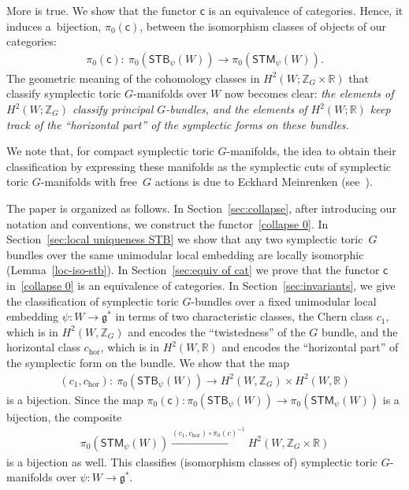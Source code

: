\documentclass[10pt,a4paper]{amsart}
\numberwithin{equation}{section}
\begin{document}
More is true.  We show that the functor ${\textsf{c}}$ is an
equivalence of categories. Hence, it induces a~bijection,
$\pi_0({\textsf{c}})$, between the isomorphism classes of objects of our
categories:
\begin{gather*}
\pi_0({\textsf{c}}) \colon \  \pi_0({\textsf{STB}}_\psi (W))   \to
                  \pi_0({\textsf{STM}}_\psi(W)).
\end{gather*}
The geometric meaning of the cohomology classes in $H^2 (W; {\mathbb Z}_G \times {\mathbb R})$
that classify symplectic toric $G$-manifolds over $W$ now becomes clear:
\emph{the elements of $H^2(W; {\mathbb Z}_G)$ classify principal $G$-bundles,
and the elements of $H^2(W; {\mathbb R})$
keep track of the ``horizontal part'' of the symplectic forms on these bundles.}

We note that, for compact symplectic toric $G$-manifolds,
the idea to obtain their classif\/ication by expressing these manifolds
as the symplectic cuts of symplectic toric $G$-manifolds with free~$G$ actions
is due to Eckhard Meinrenken (see~\cite[Chapter~7, Section~5]{Meinrenken}).

The paper is organized as follows.
In Section~\ref{sec:collapse}, after introducing our notation and
conventions, we construct the functor~\eqref{collapse 0}.  In
Section~\ref{sec:local uniqueness STB} we show that any two symplectic
toric~$G$ bundles over the same unimodular local embedding are locally
isomorphic (Lemma~\ref{loc-iso-stb}).
In Section~\ref{sec:equiv of cat} we
prove that the functor ${\textsf{c}}$ in~\eqref{collapse 0} is an equivalence of categories.  In
Section~\ref{sec:invariants}, we give the classif\/ication of symplectic
toric $G$-bundles over a f\/ixed unimodular local embedding $\psi\colon W \to
{\mathfrak g}^*$ in terms of two characteristic classes, the Chern class
$c_1$, which is in $H^2(W,{\mathbb Z}_G)$ and encodes the ``twistedness'' of
the $G$ bundle, and the horizontal class $c_{\text{hor}}$, which is in
$H^2(W,{\mathbb R})$ and encodes the ``horizontal part'' of the symplectic form
on the bundle.  We show that the map
\begin{gather*}
(c_1, c_{\text{hor}})\colon \  \pi_0 ({\textsf{STB}}_\psi(W)) \to H^2(W, {\mathbb Z}_G)\times H^2(W, {\mathbb R})
\end{gather*}
is a bijection.  Since the map $\pi_0({\textsf{c}}) \colon \pi_0({\textsf{STB}}_{\psi}(W))
\to \pi_0({\textsf{STM}}_{\psi}(W)) $ is a bijection, the composite
\begin{gather*}
\pi_0({\textsf{STM}}_\psi (W)) \xrightarrow{(c_1,c_{\text{hor}})\circ \pi_0(c)^{-1} }
H^2(W, {\mathbb Z}_G \times {\mathbb R})
\end{gather*}
is a bijection as well.
This classif\/ies (isomorphism classes of) symplectic toric
$G$-manifolds over $\psi\colon W \to {\mathfrak g}^*$.
\end{document}
